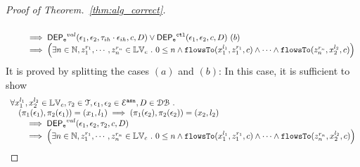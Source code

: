 \begin{proof}[Proof of Theorem.~\ref{thm:alg_correct}]
$$\begin{array}{l}
 \\ \qquad \implies 
\mathsf{DEP_{\mathtt{e}}}^{val}(\mathtt{\epsilon}_1, \mathtt{\epsilon}_2, \mathtt{\tau}_{ih} \cdot \mathtt{\epsilon}_{ih}, c, D)
\lor
\mathsf{DEP_{\mathtt{e}}}^{\mathtt{{ctl}}}(\mathtt{\epsilon}_1, \mathtt{\epsilon}_2, c, D)  ~ (b)
  \\ \qquad \implies
   \Big(\exists  n \in \mathbb{N}, z_1^{r_1}, \cdots, z_n^{r_n} \in \mathbb{LV}_{{c}} ~.~ 0 \leq n
 \land \mathtt{flowsTo}(x_1^{l_1}, z_1^{r_1}, c) \land \cdots \land \mathtt{flowsTo}(z_n^{r_n}, {x}_2^{l_2}, c) \Big)
\end{array}
$$
%
It is proved by splitting the cases $(a)$ and $(b)$:
%
%
In this case, it is sufficient to show
 \[
\begin{array}{l}
\forall {x}_1^{l_1}, {x}_2^{l_2} \in \mathbb{LV}_{{c}}, \mathtt{\tau}_2 \in \mathcal{T}, 
\mathtt{\epsilon}_1, \mathtt{\epsilon}_2 \in \mathcal{E}^{\mathtt{{asn}}}, D \in \mathcal{DB} ~.~
\\ \quad
(\pi_{1}{(\mathtt{\epsilon}_1)}, \pi_{2}{(\mathtt{\epsilon}_1)}) = ({x}_1, l_1)
\implies
(\pi_{1}{(\mathtt{\epsilon}_2)}, \pi_{2}{(\mathtt{\epsilon}_2)}) = ({x}_2, l_2)
 \\ \qquad \implies 
\mathsf{DEP_{\mathtt{e}}}^{val}(\mathtt{\epsilon}_1, \mathtt{\epsilon}_2, \mathtt{\tau}_2, c, D)
 \\ \qquad \implies
   \Big(\exists  n \in \mathbb{N}, z_1^{r_1}, \cdots, z_n^{r_n} \in \mathbb{LV}_{{c}} ~.~ 0 \leq n
 \land \mathtt{flowsTo}(x_1^{l_1}, z_1^{r_1}, c) \land \cdots \land \mathtt{flowsTo}(z_n^{r_n}, {x}_2^{l_2}, c) \Big)
\end{array}
\]
%

\end{proof}
